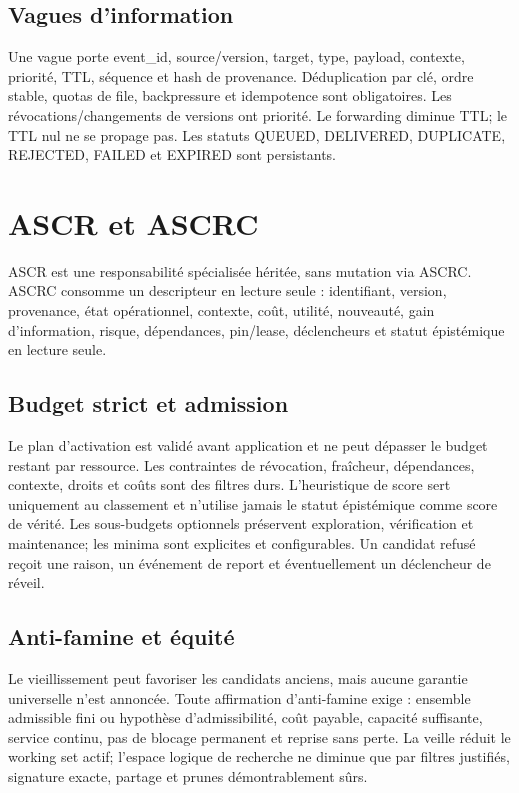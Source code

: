 \documentclass[10pt,a4paper]{article}
\begin{document}
\subsection{Vagues d'information}
Une vague porte event\_id, source/version, target, type, payload, contexte, priorité, TTL, séquence et hash de provenance. Déduplication par clé, ordre stable, quotas de file, backpressure et idempotence sont obligatoires. Les révocations/changements de versions ont priorité. Le forwarding diminue TTL; le TTL nul ne se propage pas. Les statuts QUEUED, DELIVERED, DUPLICATE, REJECTED, FAILED et EXPIRED sont persistants.

\section{ASCR et ASCRC}
ASCR est une responsabilité spécialisée héritée, sans mutation via ASCRC. ASCRC consomme un descripteur en lecture seule : identifiant, version, provenance, état opérationnel, contexte, coût, utilité, nouveauté, gain d'information, risque, dépendances, pin/lease, déclencheurs et statut épistémique en lecture seule.

\subsection{Budget strict et admission}
Le plan d'activation est validé avant application et ne peut dépasser le budget restant par ressource. Les contraintes de révocation, fraîcheur, dépendances, contexte, droits et coûts sont des filtres durs. L'heuristique de score sert uniquement au classement et n'utilise jamais le statut épistémique comme score de vérité. Les sous-budgets optionnels préservent exploration, vérification et maintenance; les minima sont explicites et configurables. Un candidat refusé reçoit une raison, un événement de report et éventuellement un déclencheur de réveil.

\subsection{Anti-famine et équité}
Le vieillissement peut favoriser les candidats anciens, mais aucune garantie universelle n'est annoncée. Toute affirmation d'anti-famine exige : ensemble admissible fini ou hypothèse d'admissibilité, coût payable, capacité suffisante, service continu, pas de blocage permanent et reprise sans perte. La veille réduit le working set actif; l'espace logique de recherche ne diminue que par filtres justifiés, signature exacte, partage et prunes démontrablement sûrs.
\end{document}
